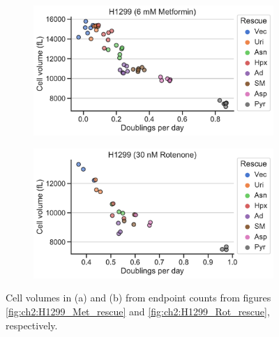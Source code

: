 \begin{figure}
     \centering
     \begin{subfigure}[b]{0.49\textwidth}
         \includegraphics[width=\textwidth]{figures/chap6/H1299_Met_cellvol.pdf}
         \caption{}
         \label{fig:ch6:H1299_Met_cellvol}
     \end{subfigure}
     \hfill
     \begin{subfigure}[b]{0.49\textwidth}
         \includegraphics[width=\textwidth]{figures/chap6/H1299_Rot_cellvol.pdf}
         \caption{}
         \label{fig:ch6:H1299_Rot_cellvol}
     \end{subfigure}
        \caption[hhhh.]{
        Cell volumes in (a) and (b) from endpoint counts from figures \ref{fig:ch2:H1299_Met_rescue} and \ref{fig:ch2:H1299_Rot_rescue}, respectively.
        }
        \label{fig:ch6:H1299_ETCrescue_vol}
\end{figure}












